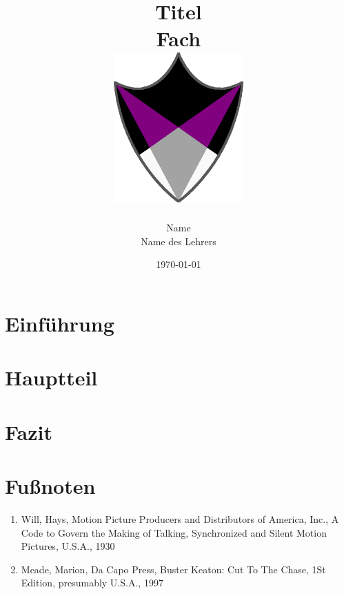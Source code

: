 \documentclass[11pt,a4paper]{article}
\title{
      {Titel}\\
      {Fach}\\
      {\vspace{1cm}}
      {\includegraphics[width=50mm,scale=1]{aceing_shield.png}}}
\author{Name\\Name des Lehrers}
\date{\today}
\begin{document}
\pagestyle{fancy}
\fancyhead{}
\fancyfoot[C]{\thepage}
\renewcommand{\footrulewidth}{1pt}
\renewcommand{\headrulewidth}{1pt}

\newcommand{\fakesection}[1]{%
  \par\refstepcounter{section}%
  \sectionmark{#1}%
  \addcontentsline{toc}{section}{\protect\numberline{\thesection}#1}%
}

\newcommand{\fakesubsection}[1]{%
  \par\refstepcounter{subsection}%
  \sectionmark{#1}%
  \addcontentsline{toc}{subsection}{\protect\numberline{\thesubsection}#1}%
}

\onehalfspacing
\maketitle
\thispagestyle{empty}
\newpage
\tableofcontents
\thispagestyle{empty}
\newpage


\section{Einführung}

\clearpage

\section{Hauptteil}

\clearpage

\section{Fazit}

\clearpage

\section{Fußnoten}

\renewcommand{\labelenumi}{\alph{enumi})} %
\begin{enumerate}
\item Will, Hays, Motion Picture Producers and Distributors of America, Inc., A Code to Govern the Making of Talking, Synchronized and Silent Motion Pictures, U.S.A., 1930
\item Meade, Marion,‎ Da Capo Press, Buster Keaton: Cut To The Chase, 1St Edition, presumably U.S.A., 1997
\end{enumerate}
\end{document}
